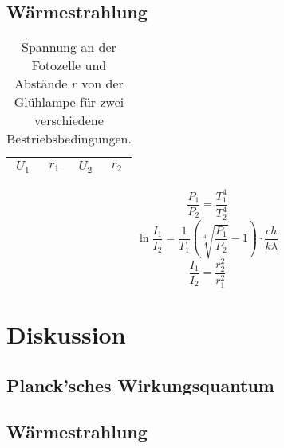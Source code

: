 \documentclass{article}
\begin{document}
\subsection{Wärmestrahlung}


\begin{table}[H]
\begin{center}
\begin{tabular}{|c|c|c|c|}
\hline
$U_1$ & $r_1$ & $U_2$ & $r_2$\\
\hline
\hline
\end{tabular}
\caption{Spannung an der Fotozelle und Abstände $r$ von der Glühlampe für zwei verschiedene Bestriebsbedingungen.}
\end{center}
\end{table}



$$\frac{P_1}{P_2} = \frac{T_1^4}{T_2^4}$$
$$\ln \frac{I_1}{I_2} = \frac{1}{T_1} \left(\sqrt[4]{\frac{P_1}{P_2}}-1\right) \cdot \frac{ch}{k\lambda}$$
$$\frac{I_1}{I_2} = \frac{r_2^2}{r_1^2}$$

\section{Diskussion}
\subsection{Planck'sches Wirkungsquantum}
\subsection{Wärmestrahlung}
																								
\end{document}
